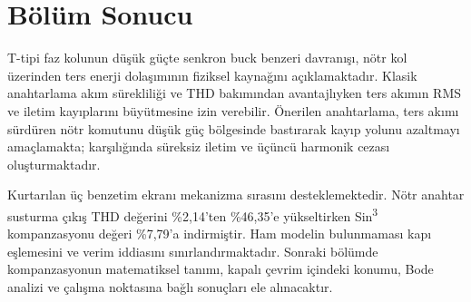\section{Bölüm Sonucu}

T-tipi faz kolunun düşük güçte senkron buck benzeri davranışı, nötr kol üzerinden ters enerji dolaşımının fiziksel kaynağını açıklamaktadır. Klasik anahtarlama akım sürekliliği ve THD bakımından avantajlıyken ters akımın RMS ve iletim kayıplarını büyütmesine izin verebilir. Önerilen anahtarlama, ters akımı sürdüren nötr komutunu düşük güç bölgesinde bastırarak kayıp yolunu azaltmayı amaçlamakta; karşılığında süreksiz iletim ve üçüncü harmonik cezası oluşturmaktadır.

Kurtarılan üç benzetim ekranı mekanizma sırasını desteklemektedir. Nötr anahtar susturma çıkış THD değerini \%2,14'ten \%46,35'e yükseltirken Sin\textsuperscript{3} kompanzasyonu değeri \%7,79'a indirmiştir. Ham modelin bulunmaması kapı eşlemesini ve verim iddiasını sınırlandırmaktadır. Sonraki bölümde kompanzasyonun matematiksel tanımı, kapalı çevrim içindeki konumu, Bode analizi ve çalışma noktasına bağlı sonuçları ele alınacaktır.
